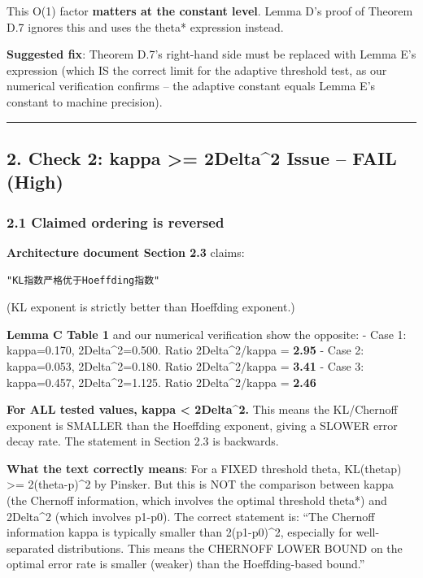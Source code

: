 \documentclass[
  12pt,
]{ctexart}
\begin{document}
This O(1) factor \textbf{matters at the constant level}. Lemma D's proof
of Theorem D.7 ignores this and uses the theta* expression instead.

\textbf{Suggested fix}: Theorem D.7's right-hand side must be replaced
with Lemma E's expression (which IS the correct limit for the adaptive
threshold test, as our numerical verification confirms -- the adaptive
constant equals Lemma E's constant to machine precision).

\begin{center}\rule{0.5\linewidth}{0.5pt}\end{center}

\subsection{2. Check 2: kappa \textgreater= 2Delta\^{}2 Issue -- FAIL
(High)}\label{check-2-kappa-2delta2-issue-fail-high}

\subsubsection{2.1 Claimed ordering is
reversed}\label{claimed-ordering-is-reversed}

\textbf{Architecture document Section 2.3} claims:

\begin{verbatim}
"KL指数严格优于Hoeffding指数"
\end{verbatim}

(KL exponent is strictly better than Hoeffding exponent.)

\textbf{Lemma C Table 1} and our numerical verification show the
opposite: - Case 1: kappa=0.170, 2Delta\^{}2=0.500. Ratio
2Delta\^{}2/kappa = \textbf{2.95} - Case 2: kappa=0.053,
2Delta\^{}2=0.180. Ratio 2Delta\^{}2/kappa = \textbf{3.41} - Case 3:
kappa=0.457, 2Delta\^{}2=1.125. Ratio 2Delta\^{}2/kappa = \textbf{2.46}

\textbf{For ALL tested values, kappa \textless{} 2Delta\^{}2.} This
means the KL/Chernoff exponent is SMALLER than the Hoeffding exponent,
giving a SLOWER error decay rate. The statement in Section 2.3 is
backwards.

\textbf{What the text correctly means}: For a FIXED threshold theta,
KL(theta\textbar\textbar p) \textgreater= 2(theta-p)\^{}2 by Pinsker.
But this is NOT the comparison between kappa (the Chernoff information,
which involves the optimal threshold theta*) and 2Delta\^{}2 (which
involves p1-p0). The correct statement is: ``The Chernoff information
kappa is typically smaller than 2(p1-p0)\^{}2, especially for
well-separated distributions. This means the CHERNOFF LOWER BOUND on the
optimal error rate is smaller (weaker) than the Hoeffding-based bound.''
\end{document}
